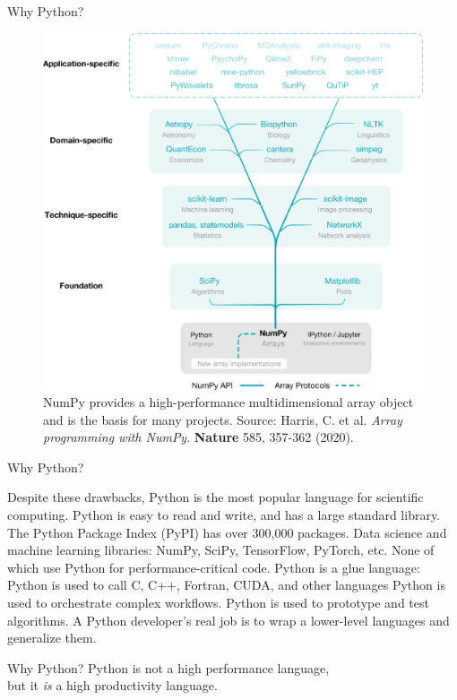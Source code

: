 \documentclass[aspectratio=169]{beamer}
\begin{document}
    \begin{frame}{Why Python?}
        \begin{figure}[H]
            \centering
            \includegraphics[width=0.40\linewidth]{numpy.png}
            \caption{NumPy provides a high-performance multidimensional array object and is the basis for many projects. Source: Harris, C. et al. \textit{Array programming with NumPy}. \textbf{Nature} 585, 357-362 (2020).}
        \end{figure}
    \end{frame}

    \begin{frame}{Why Python?}
        \begin{outline}
            \1 Despite these drawbacks, Python is the most popular language for scientific computing.
                \2 Python is easy to read and write, and has a large standard library.
                \2 The Python Package Index (PyPI) has over 300,000 packages.
                \2 Data science and machine learning libraries: NumPy, SciPy, TensorFlow, PyTorch, etc. 
                    \3 None of which use Python for performance-critical code.
            \1 Python is a glue language:
                \2 Python is used to call C, C++, Fortran, CUDA, and other languages
                \2 Python is used to orchestrate complex workflows.
                \2 Python is used to prototype and test algorithms.
            \1 A Python developer's real job is to wrap a lower-level languages and generalize them.
        \end{outline}
    \end{frame}

    \begin{frame}{Why Python?}
        \centering
        \Huge Python is not a high performance language,\\
        but it \textit{is} a high productivity language.
    \end{frame}
\end{document}
